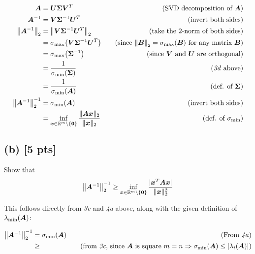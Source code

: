 \documentclass[twoside,10pt]{article}
\begin{document}
{\begin{align*}
  \mtx{A} &= \mtx{U} \mtx{\Sigma} \mtx{V}^T&\quad\text{(SVD decomposition of $\mtx{A}$)}\\
  \mtx{A}^{-1} &= \mtx{V} \mtx{\Sigma}^{-1} \mtx{U}^T&\quad\text{(invert both sides)}\\
  \left\|\mtx{A}^{-1}\right\|_2 &= \left\|\mtx{V} \mtx{\Sigma}^{-1} \mtx{U}^T\right\|_2&\quad\text{(take the 2-norm of both sides)}\\
  &= \sigma_{\mathrm{max}}\left(\mtx{V} \mtx{\Sigma}^{-1} \mtx{U}^T\right)&\quad\text{(since $\left\|\mtx{B}\right\|_2 = \sigma_{\mathrm{max}}\left(\mtx{B}\right)$ for any matrix $\mtx{B}$)}\\
  &= \sigma_{\mathrm{max}}\left(\mtx{\Sigma}^{-1}\right)&\quad\text{(since $\mtx{V}$ and $\mtx{U}$ are orthogonal)}\\
  &= \frac{1}{\sigma_{\mathrm{min}}\left(\mtx{\Sigma}\right)}&\quad\text{(\textit{3d} above)}\\
  &= \frac{1}{\sigma_{\mathrm{min}}\left(\mtx{A}\right)}&\quad\text{(def. of $\mtx{\Sigma}$)}\\
  \left\|\mtx{A}^{-1}\right\|_2^{-1} &= \sigma_{\mathrm{min}}\left(\mtx{A}\right)&\quad\text{(invert both sides)}\\
  &=  \inf \limits_{\vct{x} \in \R^m \setminus \{\vct{0}\}} \frac{\|\mtx{A}\vct{x}\|_2}{\|\vct{x}\|_2}&\quad\text{(def. of $\sigma_\mathrm{min}$)}
\end{align*}

\subsection*{(b) [5 pts]}
Show that 
\begin{equation}
  \left\|\mtx{A}^{-1}\right\|_2^{-1} \geq \inf \limits_{\vct{x} \in \R^m \setminus \{\vct{0}\}} \frac{|\vct{x}^T \mtx{A}\vct{x}|}{\|\vct{x}\|_2^2}
\end{equation}

This follows directly from \textit{3c} and \textit{4a} above, along with the given definition of $\lambda_{\mathrm{min}}(\bm{A})$:

\begin{align*}
  \left\|\mtx{A}^{-1}\right\|_2^{-1} &= \sigma_{\mathrm{min}}\left(\mtx{A}\right)&\quad\text{(From \textit{4a})}\\
  &\geq&\quad\text{(from \textit{3c}, since $\mtx{A}$ is square $m = n \Rightarrow \sigma_{\mathrm{min}}(\mtx{A}) \leq \left|\lambda_{i}\left(\mtx{A}\right)\right|$)}
\end{align*}


}
\end{document}
